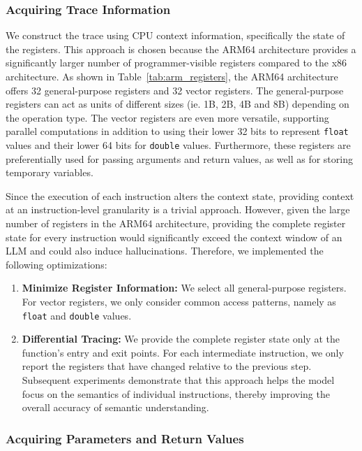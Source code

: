 \documentclass[acmsmall,screen,review,anonymous]{acmart} %
\begin{document}
\subsubsection{Acquiring Trace Information}

We construct the trace using CPU context information, specifically the state of the registers. This approach is chosen because the ARM64 architecture provides a significantly larger number of programmer-visible registers compared to the x86 architecture. As shown in Table~\ref{tab:arm_registers}, the ARM64 architecture offers 32 general-purpose registers and 32 vector registers. The general-purpose registers can act as units of different sizes (ie. 1B, 2B, 4B and 8B) depending on the operation type. The vector registers are even more versatile, supporting parallel computations in addition to using their lower 32 bits to represent \texttt{float} values and their lower 64 bits for \texttt{double} values. Furthermore, these registers are preferentially used for passing arguments and return values, as well as for storing temporary variables.

Since the execution of each instruction alters the context state, providing context at an instruction-level granularity is a trivial approach. However, given the large number of registers in the ARM64 architecture, providing the complete register state for every instruction would significantly exceed the context window of an LLM and could also induce hallucinations. Therefore, we implemented the following optimizations:
\begin{enumerate}
    \item \textbf{Minimize Register Information:} We select all general-purpose registers. For vector registers, we only consider common access patterns, namely as \texttt{float} and \texttt{double} values.
    \item \textbf{Differential Tracing:} We provide the complete register state only at the function's entry and exit points. For each intermediate instruction, we only report the registers that have changed relative to the previous step. Subsequent experiments demonstrate that this approach helps the model focus on the semantics of individual instructions, thereby improving the overall accuracy of semantic understanding.
\end{enumerate}

\subsubsection{Acquiring Parameters and Return Values}
\end{document}
